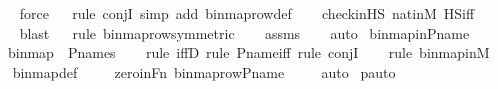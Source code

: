 \begin{isabellebody}
\ \ \ \isamarkupfalse%
\ force\isanewline
\ \ \isamarkupfalse%
{\isacharparenleft}{\kern0pt}rule\ conjI{\isacharcomma}{\kern0pt}\ simp\ add{\isacharcolon}{\kern0pt}\ binmap{\isacharunderscore}{\kern0pt}row{\isacharprime}{\kern0pt}{\isacharunderscore}{\kern0pt}def{\isacharparenright}{\kern0pt}\isanewline
\ \ \isamarkupfalse%
\ check{\isacharunderscore}{\kern0pt}in{\isacharunderscore}{\kern0pt}HS\ nat{\isacharunderscore}{\kern0pt}in{\isacharunderscore}{\kern0pt}M\ HS{\isacharunderscore}{\kern0pt}iff\ \isanewline
\ \ \ \isamarkupfalse%
\ blast\isanewline
\ \ \isamarkupfalse%
{\isacharparenleft}{\kern0pt}rule\ binmap{\isacharunderscore}{\kern0pt}row{\isacharprime}{\kern0pt}{\isacharunderscore}{\kern0pt}symmetric{\isacharparenright}{\kern0pt}\isanewline
\ \ \isamarkupfalse%
\ assms\isanewline
\ \ \isamarkupfalse%
\ auto%
\endisatagproof
{\isafoldproof}%
%
\isadelimproof
\isanewline
%
\endisadelimproof
\isanewline
{}\isamarkupfalse%
\ binmap{\isacharprime}{\kern0pt}{\isacharunderscore}{\kern0pt}in{\isacharunderscore}{\kern0pt}P{\isacharunderscore}{\kern0pt}name\ {\isacharcolon}{\kern0pt}\ \isanewline
\ \ \ {\isachardoublequoteopen}binmap{\isacharprime}{\kern0pt}\ {\isasymin}\ P{\isacharunderscore}{\kern0pt}names{\isachardoublequoteclose}\ \isanewline
%
\isadelimproof
\isanewline
\ \ %
\endisadelimproof
%
\isatagproof
{}\isamarkupfalse%
{\isacharparenleft}{\kern0pt}rule\ iffD{}{\isacharcomma}{\kern0pt}\ rule\ P{\isacharunderscore}{\kern0pt}name{\isacharunderscore}{\kern0pt}iff{\isacharcomma}{\kern0pt}\ rule\ conjI{\isacharparenright}{\kern0pt}\isanewline
\ \ \ \isamarkupfalse%
{\isacharparenleft}{\kern0pt}rule\ binmap{\isacharprime}{\kern0pt}{\isacharunderscore}{\kern0pt}in{\isacharunderscore}{\kern0pt}M{\isacharparenright}{\kern0pt}\isanewline
\ \ \isamarkupfalse%
\ binmap{\isacharprime}{\kern0pt}{\isacharunderscore}{\kern0pt}def\ \isanewline
\ \ \isamarkupfalse%
\ zero{\isacharunderscore}{\kern0pt}in{\isacharunderscore}{\kern0pt}Fn\ binmap{\isacharunderscore}{\kern0pt}row{\isacharprime}{\kern0pt}{\isacharunderscore}{\kern0pt}P{\isacharunderscore}{\kern0pt}name\ \isanewline
\ \ \isamarkupfalse%
\ auto%
\endisatagproof
{\isafoldproof}%
%
\isadelimproof
\isanewline
%
\endisadelimproof
\isanewline
{}\isamarkupfalse%
\ pauto{\isacharunderscore}{\kern0pt}{}\ {\isacharcolon}{\kern0pt}\ \isanewline

\end{isabellebody}
